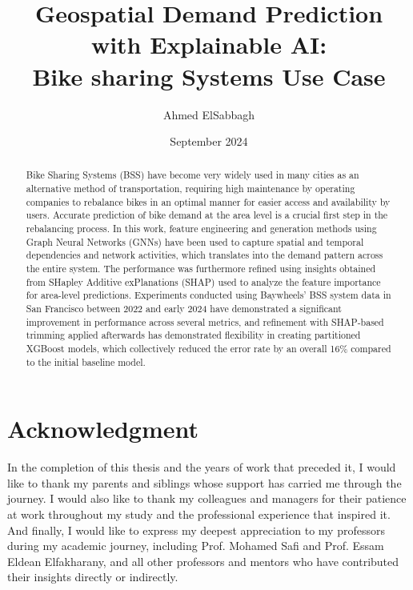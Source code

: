 \documentclass{article}
\title{Geospatial Demand Prediction \protect\\ with Explainable AI: \protect\\ Bike sharing Systems Use Case
}
\author{Ahmed ElSabbagh}
\date{September 2024}
\begin{document}
\graphicspath{ {./images/} }
\maketitle

\pagebreak

\begin{abstract}
Bike Sharing Systems (BSS) have become very widely used in many cities as an alternative method of transportation, requiring high maintenance by operating companies to rebalance bikes in an optimal manner for easier access and availability by users. Accurate prediction of bike demand at the area level is a crucial first step in the rebalancing process. In this work, feature engineering and generation methods using Graph Neural Networks (GNNs) have been used to capture spatial and temporal dependencies and network activities, which translates into the demand pattern across the entire system. The performance was furthermore refined using insights obtained from SHapley Additive exPlanations (SHAP) used to analyze the feature importance for area-level predictions. Experiments conducted using Baywheels' BSS system data in San Francisco between 2022 and early 2024 have demonstrated a significant improvement in performance across several metrics, and refinement with SHAP-based trimming applied afterwards has demonstrated flexibility in creating partitioned XGBoost models, which collectively reduced the error rate by an overall 16\% compared to the initial baseline model.

\end{abstract}
\pagebreak

\section*{\centering Acknowledgment}

In the completion of this thesis and the years of work that preceded it, I would like to
thank my parents and siblings whose support has carried me through the journey. I would also like to thank my colleagues and managers for their patience at work throughout my study and the professional experience that inspired it. And finally, I would like to express my deepest appreciation to my professors during my academic journey, including Prof. Mohamed Safi and Prof. Essam Eldean Elfakharany, and all other professors and mentors who have contributed their insights directly or indirectly.

\pagebreak
\end{document}
